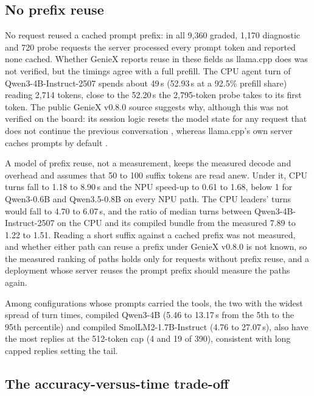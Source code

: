 \documentclass[11pt]{article}
\begin{document}
\subsection{No prefix reuse}\label{sec:prefix}

No request reused a cached prompt prefix: in all 9,360 graded, 1,170 diagnostic and 720 probe requests the server processed every prompt token and reported none cached. Whether GenieX reports reuse in these fields as llama.cpp does was not verified, but the timings agree with a full prefill. The CPU agent turn of Qwen3-4B-Instruct-2507 spends about 49\,s (52.93\,s at a 92.5\% prefill share) reading 2,714 tokens, close to the 52.20\,s the 2,795-token probe takes to its first token. The public GenieX v0.8.0 source suggests why, although this was not verified on the board: its session logic resets the model state for any request that does not continue the previous conversation \citep{geniexSource}, whereas llama.cpp's own server caches prompts by default \citep{llamacppServer}.

A model of prefix reuse, not a measurement, keeps the measured decode and overhead and assumes that 50 to 100 suffix tokens are read anew. Under it, CPU turns fall to 1.18 to 8.90\,s and the NPU speed-up to 0.61 to 1.68, below 1 for Qwen3-0.6B and Qwen3.5-0.8B on every NPU path. The CPU leaders' turns would fall to 4.70 to 6.07\,s, and the ratio of median turns between Qwen3-4B-Instruct-2507 on the CPU and its compiled bundle from the measured 7.89 to 1.22 to 1.51. Reading a short suffix against a cached prefix was not measured, and whether either path can reuse a prefix under GenieX v0.8.0 is not known, so the measured ranking of paths holds only for requests without prefix reuse, and a deployment whose server reuses the prompt prefix should measure the paths again.

Among configurations whose prompts carried the tools, the two with the widest spread of turn times, compiled Qwen3-4B (5.46 to 13.17\,s from the 5th to the 95th percentile) and compiled SmolLM2-1.7B-Instruct (4.76 to 27.07\,s), also have the most replies at the 512-token cap (4 and 19 of 390), consistent with long capped replies setting the tail.

\subsection{The accuracy-versus-time trade-off}\label{sec:tradeoff}
\end{document}
